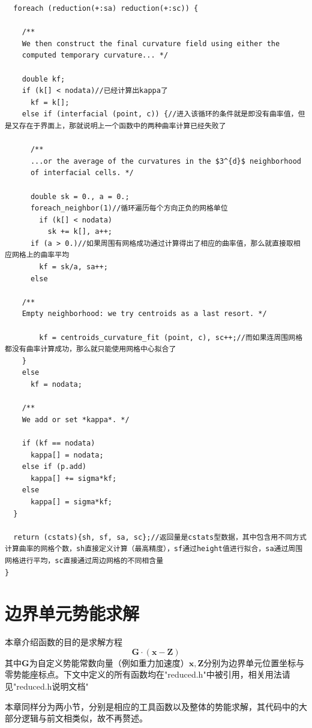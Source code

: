 \documentclass[lang=cn,11pt,a4paper]{elegantpaper}
\begin{document}
\begin{verbatim}
  foreach (reduction(+:sa) reduction(+:sc)) {
    
    /**
    We then construct the final curvature field using either the
    computed temporary curvature... */

    double kf;
    if (k[] < nodata)//已经计算出kappa了
      kf = k[];
    else if (interfacial (point, c)) {//进入该循环的条件就是即没有曲率值，但是又存在于界面上，那就说明上一个函数中的两种曲率计算已经失败了

      /**
      ...or the average of the curvatures in the $3^{d}$ neighborhood
      of interfacial cells. */
      
      double sk = 0., a = 0.;
      foreach_neighbor(1)//循环遍历每个方向正负的网格单位
        if (k[] < nodata)
          sk += k[], a++;
      if (a > 0.)//如果周围有网格成功通过计算得出了相应的曲率值，那么就直接取相应网格上的曲率平均
        kf = sk/a, sa++;
      else

	/**
	Empty neighborhood: we try centroids as a last resort. */

        kf = centroids_curvature_fit (point, c), sc++;//而如果连周围网格都没有曲率计算成功，那么就只能使用网格中心拟合了
    }
    else
      kf = nodata;

    /**
    We add or set *kappa*. */
    
    if (kf == nodata)
      kappa[] = nodata;
    else if (p.add)
      kappa[] += sigma*kf;
    else
      kappa[] = sigma*kf;      
  }

  return (cstats){sh, sf, sa, sc};//返回量是cstats型数据，其中包含用不同方式计算曲率的网格个数，sh直接定义计算（最高精度），sf通过height值进行拟合，sa通过周围网格进行平均，sc直接通过周边网格的不同相含量
}
\end{verbatim}

\section{边界单元势能求解}
本章介绍函数的目的是求解方程
\begin{equation}\label{equ:po}
  \mathbf{G} \cdot ( \mathbf{x} - \mathbf{Z})
\end{equation}
其中$ \mathbf{G}$为自定义势能常数向量（例如重力加速度）$ \mathbf{x}, \mathbf{Z}$分别为边界单元位置坐标与零势能座标点。下文中定义的所有函数均在"reduced.h"中被引用，相关用法请见"reduced.h说明文档"\par
本章同样分为两小节，分别是相应的工具函数以及整体的势能求解，其代码中的大部分逻辑与前文相类似，故不再赘述。
\end{document}
